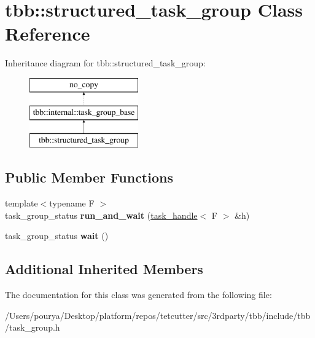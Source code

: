 \hypertarget{classtbb_1_1structured__task__group}{}\section{tbb\+:\+:structured\+\_\+task\+\_\+group Class Reference}
\label{classtbb_1_1structured__task__group}
Inheritance diagram for tbb\+:\+:structured\+\_\+task\+\_\+group\+:\begin{figure}[H]
\begin{center}
\leavevmode
\includegraphics[height=3.000000cm]{classtbb_1_1structured__task__group}
\end{center}
\end{figure}
\subsection*{Public Member Functions}
\begin{DoxyCompactItemize}
\item 
\hypertarget{classtbb_1_1structured__task__group_ab6812c9b682cec4b1a93da169b6fffc7}{}{\footnotesize template$<$typename F $>$ }\\task\+\_\+group\+\_\+status {\bfseries run\+\_\+and\+\_\+wait} (\hyperlink{classtbb_1_1task__handle}{task\+\_\+handle}$<$ F $>$ \&h)\label{classtbb_1_1structured__task__group_ab6812c9b682cec4b1a93da169b6fffc7}

\item 
\hypertarget{classtbb_1_1structured__task__group_a0578ff577290a108d395ab29a0a04e04}{}task\+\_\+group\+\_\+status {\bfseries wait} ()\label{classtbb_1_1structured__task__group_a0578ff577290a108d395ab29a0a04e04}

\end{DoxyCompactItemize}
\subsection*{Additional Inherited Members}


The documentation for this class was generated from the following file\+:\begin{DoxyCompactItemize}
\item 
/\+Users/pourya/\+Desktop/platform/repos/tetcutter/src/3rdparty/tbb/include/tbb/task\+\_\+group.\+h\end{DoxyCompactItemize}
